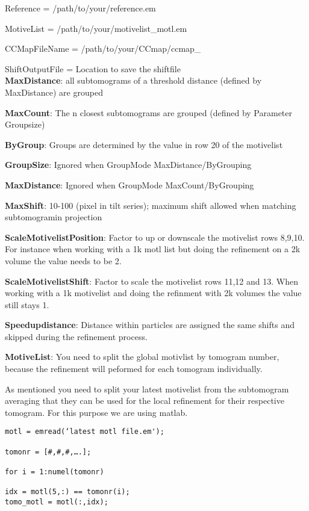 \documentclass[12pt,a4paper]{scrartcl}
\begin{document}
{Reference = /path/to/your/reference.em  

MotiveList = /path/to/your/motivelist\_motl.em

CCMapFileName = /path/to/your/CCmap/ccmap\_ 

ShiftOutputFile = Location to save the shiftfile \\


\textbf{MaxDistance}: all subtomograms of a threshold distance (defined by MaxDistance) are grouped 

\textbf{MaxCount}: The n closest subtomograms are grouped (defined by Parameter Groupsize)

\textbf{ByGroup}: Groups are determined by the value in row 20 of the motivelist

\textbf{GroupSize}: Ignored when GroupMode MaxDistance/ByGrouping

\textbf{MaxDistance}: Ignored when GroupMode MaxCount/ByGrouping 

\textbf{MaxShift}: 10-100 (pixel in tilt series); maximum shift allowed when matching subtomogramin projection 

\textbf{ScaleMotivelistPosition}: Factor to up or downscale the motivelist rows 8,9,10. For instance when working with a 1k motl list but doing the refinement on a 2k volume the value needs to be 2.  
          
\textbf{ScaleMotivelistShift}: Factor to scale the motivelist rows 11,12 and 13. When working with a 1k motivelist and doing the refinment with 2k volumes the value still stays 1. 

\textbf{Speedupdistance}: Distance within particles are assigned the same shifts and skipped during the refinement process.
 
\textbf{MotiveList}: You need to split the global motivlist by tomogram number, because the refinement will peformed for each tomogram individually.

As mentioned you need to split your latest motivelist from the subtomogram averaging that they can be used for the local refinement for their respective tomogram.
For this purpose we are using matlab. \\

\begin{lstlisting}
motl = emread(‘latest motl file.em'); 

tomonr = [#,#,#,….]; 

for i = 1:numel(tomonr) 

idx = motl(5,:) == tomonr(i);
tomo_motl = motl(:,idx);  


\end{lstlisting}}
\end{document}

